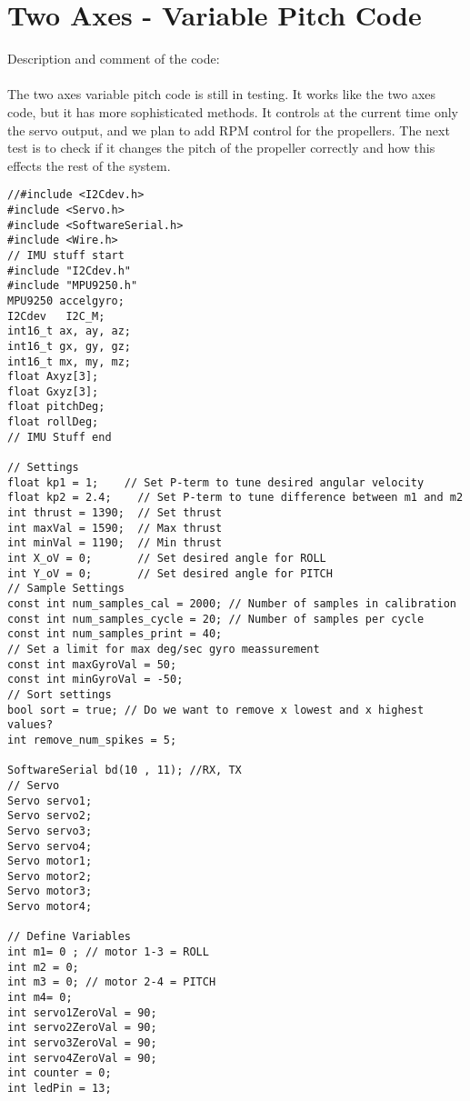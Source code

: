 \section{Two Axes - Variable Pitch Code}

Description and comment of the code: \\
\\
The two axes variable pitch code is still in testing. It works like the two axes code, but it has more sophisticated methods. It controls at the current time only the servo output, and we plan to add RPM control for the propellers. The next test is to check if it changes the pitch of the propeller correctly and how this effects the rest of the system. 

\begin{lstlisting}
//#include <I2Cdev.h>
#include <Servo.h>
#include <SoftwareSerial.h>
#include <Wire.h>
// IMU stuff start
#include "I2Cdev.h"
#include "MPU9250.h"
MPU9250 accelgyro;
I2Cdev   I2C_M;
int16_t ax, ay, az;
int16_t gx, gy, gz;
int16_t mx, my, mz;
float Axyz[3];
float Gxyz[3];
float pitchDeg;
float rollDeg;
// IMU Stuff end
 
// Settings
float kp1 = 1;    // Set P-term to tune desired angular velocity
float kp2 = 2.4;    // Set P-term to tune difference between m1 and m2
int thrust = 1390;  // Set thrust
int maxVal = 1590;  // Max thrust
int minVal = 1190;  // Min thrust
int X_oV = 0;       // Set desired angle for ROLL
int Y_oV = 0;       // Set desired angle for PITCH
// Sample Settings
const int num_samples_cal = 2000; // Number of samples in calibration
const int num_samples_cycle = 20; // Number of samples per cycle
const int num_samples_print = 40;
// Set a limit for max deg/sec gyro meassurement
const int maxGyroVal = 50;
const int minGyroVal = -50;
// Sort settings
bool sort = true; // Do we want to remove x lowest and x highest values?
int remove_num_spikes = 5;
 
SoftwareSerial bd(10 , 11); //RX, TX
// Servo
Servo servo1;
Servo servo2;
Servo servo3;
Servo servo4;
Servo motor1;
Servo motor2;
Servo motor3;
Servo motor4;
 
// Define Variables
int m1= 0 ; // motor 1-3 = ROLL
int m2 = 0;
int m3 = 0; // motor 2-4 = PITCH
int m4= 0;
int servo1ZeroVal = 90;
int servo2ZeroVal = 90;
int servo3ZeroVal = 90;
int servo4ZeroVal = 90;
int counter = 0;
int ledPin = 13;
 

\end{lstlisting}

